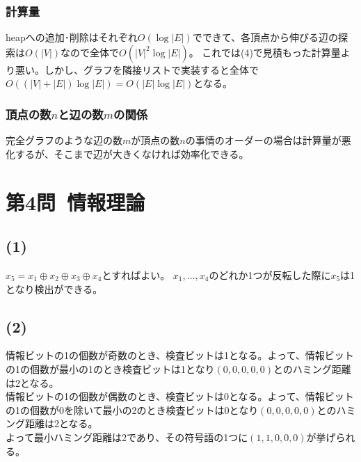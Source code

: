 \documentclass[a4paper,12pt,xelatex,ja=standard]{bxjsarticle}
\begin{document}
\subsubsection*{計算量}
heapへの追加･削除はそれぞれ$O(\log |E|)$でできて、各頂点から伸びる辺の探索は$O(|V|)$なので全体で$O(|V|^2 \log |E|)$。
これでは(4)で見積もった計算量より悪い。しかし、グラフを隣接リストで実装すると全体で$O((|V| + |E|) \log |E|) = O(|E| \log |E|)$となる。

\subsubsection*{頂点の数$n$と辺の数$m$の関係}
完全グラフのような辺の数$m$が頂点の数$n$の事情のオーダーの場合は計算量が悪化するが、そこまで辺が大きくなければ効率化できる。

\section*{第4問\ 情報理論}
\subsection*{(1)}
$x_5 = x_1 \oplus x_2 \oplus x_3 \oplus x_4$とすればよい。
$x_1, \dots, x_4$のどれか1つが反転した際に$x_5$は1となり検出ができる。

\subsection*{(2)}
情報ビットの1の個数が奇数のとき、検査ビットは1となる。よって、情報ビットの1の個数が最小の1のとき検査ビットは1となり$(0, 0, 0, 0, 0)$とのハミング距離は2となる。\\
情報ビットの1の個数が偶数のとき、検査ビットは0となる。よって、情報ビットの1の個数が0を除いて最小の2のとき検査ビットは0となり$(0, 0, 0, 0, 0)$とのハミング距離は2となる。\\
よって最小ハミング距離は2であり、その符号語の1つに$(1, 1, 0, 0, 0)$が挙げられる。
\end{document}
